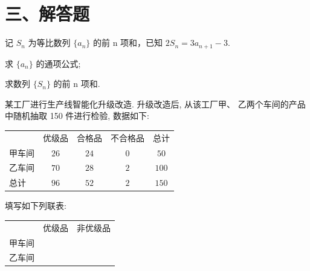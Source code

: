 \documentclass[UTF8,12pt]{ctexart}
\begin{document}
\section*{三、解答题}

\begin{questions}[start=17]

  \item 记 $S_{n}$ 为等比数列 $\{a_{n}\}$ 的前 n 项和，已知 $2S_{n}=3a_{n+1}-3$.

    \begin{subquestions}
      \item
      求 $\{a_{n}\}$ 的通项公式;
      \item
      求数列 $\{S_{n}\}$ 的前 n 项和.
    \end{subquestions}

  \item 某工厂进行生产线智能化升级改造. 升级改造后, 从该工厂甲、
    乙两个车间的产品中随机抽取 150 件进行检验, 数据如下:

    \begin{center}
      \begin{tabular}{lcccc}
        \toprule
               & 优级品 & 合格品 & 不合格品 & 总计 \\
        甲车间 & $26$   & $24$   & $0$      & $50$ \\
        乙车间 & $70$   & $28$   & $2$      & $100$ \\
        总计   & $96$   & $52$   & $2$      & $150$ \\
        \bottomrule
      \end{tabular}
    \end{center}

    \begin{subquestions}
      \item
      填写如下列联表:

        \begin{center}
          \begin{tabular}{lcc}
            \toprule
                   & 优级品 & 非优级品 \\
            甲车间 &        &  \\
            乙车间 &        &  \\
            \bottomrule
          \end{tabular}
        \end{center}


\end{subquestions}
\end{questions}
\end{document}
